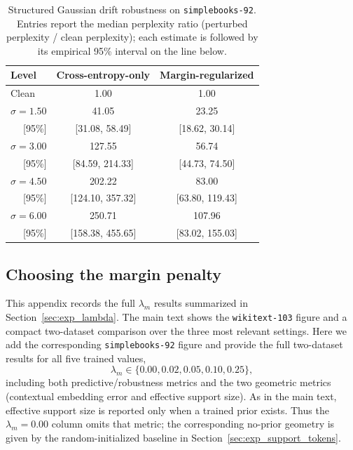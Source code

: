 \documentclass[11pt]{article}
\begin{document}
\begin{table}[H]
\centering
\caption{Structured Gaussian drift robustness on \texttt{simplebooks-92}.
Entries report the median perplexity ratio (perturbed perplexity / clean perplexity); each estimate is followed by its empirical 95\% interval on the line below.}
\label{tab:appendix_robustness_simplebooks_structured}
\small
\begin{tabular}{lcc}
\toprule
\textbf{Level} & \textbf{Cross-entropy-only} & \textbf{Margin-regularized} \\
\midrule
Clean & 1.00 & 1.00 \\
$\sigma{=}1.50$ & 41.05 & 23.25 \\
\multicolumn{1}{r}{\footnotesize [95\%]} & \footnotesize [31.08, 58.49] & \footnotesize [18.62, 30.14] \\
$\sigma{=}3.00$ & 127.55 & 56.74 \\
\multicolumn{1}{r}{\footnotesize [95\%]} & \footnotesize [84.59, 214.33] & \footnotesize [44.73, 74.50] \\
$\sigma{=}4.50$ & 202.22 & 83.00 \\
\multicolumn{1}{r}{\footnotesize [95\%]} & \footnotesize [124.10, 357.32] & \footnotesize [63.80, 119.43] \\
$\sigma{=}6.00$ & 250.71 & 107.96 \\
\multicolumn{1}{r}{\footnotesize [95\%]} & \footnotesize [158.38, 455.65] & \footnotesize [83.02, 155.03] \\
\bottomrule
\end{tabular}
\end{table}

\subsection{Choosing the margin penalty}
\label{app:appendix_lambda}

This appendix records the full $\lambda_m$ results summarized in
Section~\ref{sec:exp_lambda}. The main text shows the
\texttt{wikitext-103} figure and a compact two-dataset comparison over the
three most relevant settings. Here we add the corresponding
\texttt{simplebooks-92} figure and provide the full two-dataset results for all
five trained values,
\[
\lambda_m \in \{0.00, 0.02, 0.05, 0.10, 0.25\},
\]
including both predictive/robustness metrics and the two geometric metrics (contextual embedding error and effective support size).
As in the main text, effective support size is reported only when a trained prior exists.
Thus the $\lambda_m{=}0.00$ column omits that metric; the corresponding no-prior geometry is given by the random-initialized baseline in Section~\ref{sec:exp_support_tokens}.
\end{document}
